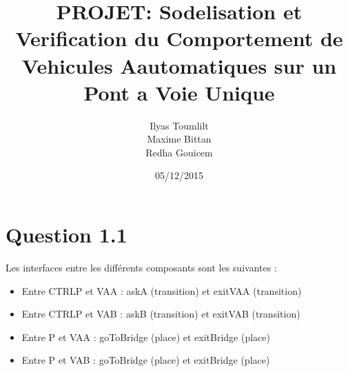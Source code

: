 \documentclass[a4paper, 11pt]{article}
\begin{document}
 
\title{PROJET: Sodelisation et Verification du Comportement de Vehicules Aautomatiques sur un Pont a Voie Unique}
\author{Ilyas Toumlilt\\Maxime Bittan\\Redha Gouicem}
\date{05/12/2015}
 
\maketitle

\section{Question 1.1}
Les interfaces entre les différents composants sont les suivantes :\\
\begin{itemize}
\item Entre CTRLP et VAA : askA (transition) et exitVAA (transition)\\
\item Entre CTRLP et VAB : askB (transition) et exitVAB (transition)\\
\item Entre P et VAA : goToBridge (place) et exitBridge (place)\\
\item Entre P et VAB : goToBridge (place) et exitBridge (place)\\
\end{itemize}
\end{document}
